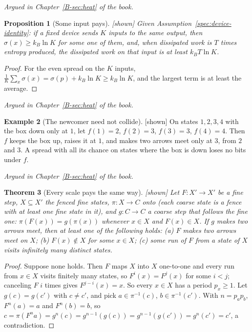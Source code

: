 \documentclass[11pt, a4paper]{article}
\theoremstyle{plain}
\newtheorem{theorem}{Theorem}[section]
\newtheorem{proposition}[theorem]{Proposition}
\theoremstyle{definition}
\newtheorem{example}[theorem]{Example}
\theoremstyle{remark}
\newcommand{\inv}{^{-1}}
\newcommand{\argued}[1]{\par\noindent\textit{Argued in Chapter~\ref{B-#1} of the book.}\par}
\newcommand{\kind}[1]{\textup{[#1]}}
\begin{document}
\argued{sec:heat}

\begin{proposition}[Some input pays]\label{spec:some-input} \kind{shown}
Given Assumption~\ref{spec:device-identity}: if a fixed device sends $K$ inputs to the same output, then
$\sigma(x)\ge k_B\ln K$ for some one of them, and, when dissipated work is $T$ times entropy produced, the
dissipated work on that input is at least $k_BT\ln K$.
\end{proposition}

\begin{proof}
For the even spread on the $K$ inputs, $\frac1K\sum_x\sigma(x)=\sigma(p)+k_B\ln K\ge k_B\ln K$, and the largest
term is at least the average.
\end{proof}

\argued{sec:heat}

\begin{example}[The newcomer need not collide]\label{spec:newcomer} \kind{shown}
On states $1,2,3,4$ with the box down only at $1$, let $f(1)=2$, $f(2)=3$, $f(3)=3$, $f(4)=4$. Then $f$ keeps
the box up, raises it at $1$, and makes two arrows meet only at $3$, from $2$ and $3$. A spread with all its
chance on states where the box is down loses no bits under $f$.
\end{example}

\argued{sec:heat}

\begin{theorem}[Every scale pays the same way]\label{spec:every-scale} \kind{shown}
Let $F:X'\to X'$ be a fine step, $X\subseteq X'$ the fenced fine states, $\pi:X\to C$ onto (each coarse state is
a fence with at least one fine state in it), and $g:C\to C$ a coarse step that follows the fine one:
$\pi(F(x))=g(\pi(x))$ whenever $x\in X$ and $F(x)\in X$. If $g$ makes two arrows meet, then at least one of the
following holds: (a) $F$ makes two arrows meet on $X$; (b) $F(x)\notin X$ for some $x\in X$; (c) some run of
$F$ from a state of $X$ visits infinitely many distinct states.
\end{theorem}

\begin{proof}
Suppose none holds. Then $F$ maps $X$ into $X$ one-to-one and every run from $x\in X$ visits finitely many
states, so $F^i(x)=F^j(x)$ for some $i<j$; canceling $F$ $i$ times gives $F^{j-i}(x)=x$. So every $x\in X$
has a period $p_x\ge1$. Let $g(c)=g(c')$ with $c\ne c'$, and pick $a\in\pi\inv(c)$, $b\in\pi\inv(c')$. With
$n=p_ap_b$, $F^n(a)=a$ and $F^n(b)=b$, so $c=\pi(F^n a)=g^n(c)=g^{n-1}(g(c))=g^{n-1}(g(c'))=g^n(c')=c'$,
a contradiction.
\end{proof}
\end{document}
